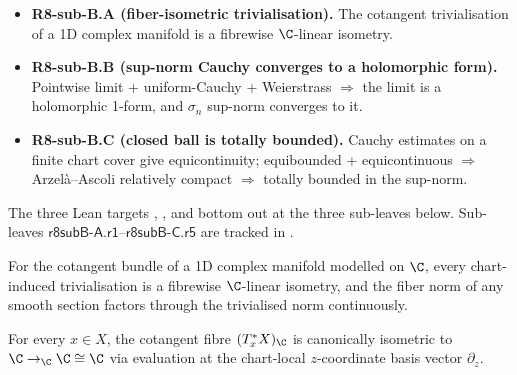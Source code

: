 \begin{itemize}
\item \textbf{R8-sub-B.A (fiber-isometric trivialisation).}  The
  cotangent trivialisation of a 1D complex manifold is a fibrewise
  \(\C\)-linear isometry.
\item \textbf{R8-sub-B.B (sup-norm Cauchy converges to a holomorphic
  form).}  Pointwise limit + uniform-Cauchy + Weierstrass \(\Rightarrow\) the
  limit is a holomorphic 1-form, and \(\sigma_{n}\) sup-norm
  converges to it.
\item \textbf{R8-sub-B.C (closed ball is totally bounded).}  Cauchy
  estimates on a finite chart cover give equicontinuity; equibounded
  + equicontinuous \(\Rightarrow\) Arzel\`a--Ascoli relatively compact \(\Rightarrow\) totally
  bounded in the sup-norm.
\end{itemize}

\begin{theorem}
\label{input:banach-data-hone}
The three Lean targets
,
, and
 bottom out
at the three sub-leaves below.  Sub-leaves
\(\textsf{r8subB-A.r1}\)--\(\textsf{r8subB-C.r5}\) are tracked in
.
\leanok
\end{theorem}

\begin{lemma}
\label{lem:r8subB-fiber-iso-triv}
For the cotangent bundle of a 1D complex manifold modelled on
\(\C\), every chart-induced trivialisation is a fibrewise
\(\C\)-linear isometry, and the fiber norm of any smooth section
factors through the trivialised norm continuously.
\leanok
\end{lemma}

\begin{lemma}
\label{lem:r8subB-A-r1}
For every \(x\in X\), the cotangent fibre \((T_{x}^{*}X)_{\C}\) is
canonically isometric to \(\C\to_{\C}\C\cong\C\) via evaluation
at the chart-local \(z\)-coordinate basis vector \(\partial_{z}\).
\leanok
\end{lemma}


